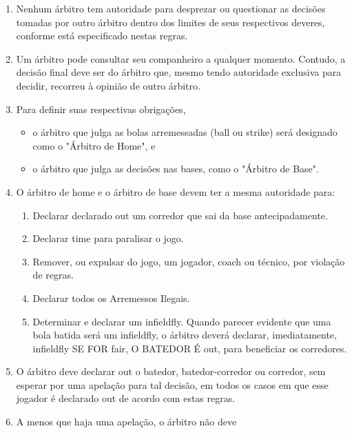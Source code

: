 \begin{enumerate}[label=(\alph*)]
\item   Nenhum árbitro tem autoridade para desprezar ou questionar as decisões tomadas por outro árbitro dentro dos limites de seus respectivos deveres, conforme está especificado nestas regras.

\item  Um árbitro pode consultar seu companheiro a qualquer momento. Contudo, a decisão final deve ser do árbitro que, mesmo tendo autoridade exclusiva para decidir, recorreu à opinião de outro árbitro.
\item  Para definir suas respectivas obrigações,
\begin{itemize}
	\item o árbitro que julga as bolas arremessadas (\gls{ball} ou \gls{strike}) será designado como o "Árbitro de Home", e
	\item o árbitro que julga as decisões nas bases, como o "Árbitro de Base".
\end{itemize}

\item  O árbitro de \gls{home} e o árbitro de base devem ter a mesma autoridade para:

	\begin{enumerate}[label=(\arabic*)]
		\item Declarar declarado \gls{out} um corredor que sai da base antecipadamente.
		\item Declarar \gls{time} para paralisar o jogo.
		\item  Remover, ou expulsar do jogo, um jogador, \gls{coach} ou técnico, por violação de regras.
		\item  Declarar todos os Arremessos Ilegais.
		\item  Determinar e declarar um \gls{infieldfly}. Quando parecer evidente que uma bola batida será um \gls{infieldfly}, o árbitro deverá declarar, imediatamente, \gls{infieldfly} SE FOR \gls{fair}, O BATEDOR É \gls{out}, para beneficiar os corredores.
	\end{enumerate}

\item  O árbitro deve declarar \gls{out} o batedor, batedor-corredor ou corredor, sem esperar por uma apelação para tal decisão, em todos os casos em que esse jogador é declarado \gls{out} de acordo com estas regras.
\item   A menos que haja uma apelação, o árbitro não deve


\end{enumerate}
